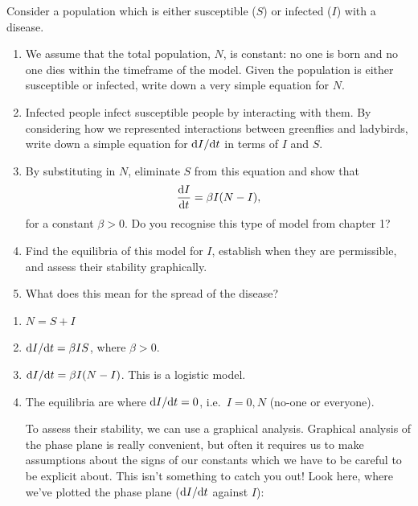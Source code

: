 \documentclass[a4paper,12pt]{article}
\begin{document}
%

\begin{enumerate}[label={\bf \arabic{*}.\;}, ref={\arabic{*}},itemsep=3ex, left=0ex]

    { %
      Consider a population which is either susceptible ($S$) or infected ($I$) with a disease.
      \begin{enumerate}[label=(\alph*)]
        \item We assume that the total population, $N$, is constant: no one is born and no one dies within the timeframe of the model. Given the population is either susceptible or infected, write down a very simple equation for $N$.
        \item Infected people infect susceptible people by interacting with them. By considering how we represented interactions between greenflies and ladybirds, write down a simple equation for $\fd{I}{t}$ in terms of $I$ and $S$.
        \item By substituting in $N$, eliminate $S$ from this equation and show that
        \begin{equation}
        	\fd{I}{t} = \beta I (N-I),
        \end{equation}
        for a constant $\beta > 0$. Do you recognise this type of model from chapter 1?
        \item Find the equilibria of this model for $I$, establish when they are permissible, and assess their stability graphically.%
        \item What does this mean for the spread of the disease? 
      \end{enumerate}
    }
    { %
      \begin{enumerate}[label=(\alph*)]
        \item $N = S + I$
        \item $\fd{I}{t} = \beta I S$, where $\beta > 0$.
        \item $\fd{I}{t} = \beta I (N-I)$. This is a logistic model.
        \item The equilibria are where $\fd{I}{t} = 0$, i.e.\ $I=0,N$ (no-one or everyone).

          To assess their stability, we can use a graphical analysis.
          Graphical analysis of the phase plane is really convenient, but often it requires us to make assumptions about the signs of our constants which we have to be careful to be explicit about. This isn't something to catch you out! Look here, where we've plotted the phase plane ($\fd{I}{t}$ against $I$):


\end{enumerate}}
\end{enumerate}
\end{document}
